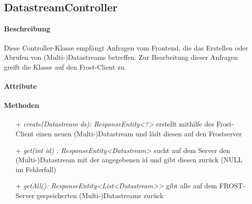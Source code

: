 \subsection{DatastreamController}

\paragraph{Beschreibung}
Diese Controller-Klasse empfängt Anfragen vom Frontend, die das Erstellen oder Abrufen von (Multi-)Datastreams betreffen. Zur Bearbeitung dieser Anfragen greift die Klasse auf den Frost-Client zu.


\paragraph{Attribute}

\paragraph{Methoden}
\begin{itemize}
\item[+] \textit{create(Datastream ds): ResponseEntity<?> }
erstellt mithilfe des Frost-Client einen neuen (Multi-)Datastream und lädt diesen auf den Frostserver
\item[+] \textit{get(int id) : ResponseEntity<Datastream>}
sucht auf dem Server den (Multi-)Datastream mit der angegebenen id und gibt diesen zurück (NULL im Fehlerfall)
\item[+] \textit{getAll(): ResponseEntity<List<Datastream>> }
gibt alle auf dem FROST-Server gespeicherten (Multi-)Datastreams zurück
\end{itemize}